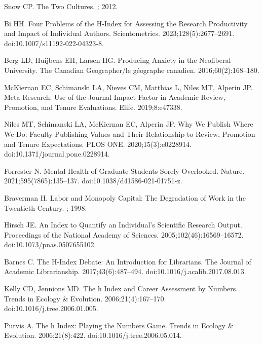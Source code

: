 \documentclass[
  10pt,
  letterpaper,
]{article}
\begin{document}
\begin{thebibliography}{10}
Snow CP.
\newblock The Two Cultures.
; 2012.

Bi HH.
\newblock Four Problems of the H-Index for Assessing the Research Productivity and Impact of Individual Authors.
\newblock Scientometrics. 2023;128(5):2677--2691.
\newblock doi:{10.1007/s11192-022-04323-8}.

Berg LD, Huijbens EH, Larsen HG.
\newblock Producing Anxiety in the Neoliberal University.
\newblock The Canadian Geographer/le g{\'e}ographe canadien. 2016;60(2):168--180.

McKiernan EC, Schimanski LA, Nieves CM, Matthias L, Niles MT, Alperin JP.
\newblock Meta-Research: {{Use}} of the Journal Impact Factor in Academic Review, Promotion, and Tenure Evaluations.
\newblock Elife. 2019;8:e47338.

Niles MT, Schimanski LA, McKiernan EC, Alperin JP.
\newblock Why We Publish Where We Do: {{Faculty}} Publishing Values and Their Relationship to Review, Promotion and Tenure Expectations.
\newblock PLOS ONE. 2020;15(3):e0228914.
\newblock doi:{10.1371/journal.pone.0228914}.

Forrester N.
\newblock Mental Health of Graduate Students Sorely Overlooked.
\newblock Nature. 2021;595(7865):135--137.
\newblock doi:{10.1038/d41586-021-01751-z}.

Braverman H.
\newblock Labor and Monopoly Capital: {{The}} Degradation of Work in the Twentieth Century.
; 1998.

Hirsch JE.
\newblock An Index to Quantify an Individual's Scientific Research Output.
\newblock Proceedings of the National Academy of Sciences. 2005;102(46):16569--16572.
\newblock doi:{10.1073/pnas.0507655102}.

Barnes C.
\newblock The H-Index {{Debate}}: {{An Introduction}} for {{Librarians}}.
\newblock The Journal of Academic Librarianship. 2017;43(6):487--494.
\newblock doi:{10.1016/j.acalib.2017.08.013}.

Kelly CD, Jennions MD.
\newblock The h Index and Career Assessment by Numbers.
\newblock Trends in Ecology \& Evolution. 2006;21(4):167--170.
\newblock doi:{10.1016/j.tree.2006.01.005}.

Purvis A.
\newblock The h Index: Playing the Numbers Game.
\newblock Trends in Ecology \& Evolution. 2006;21(8):422.
\newblock doi:{10.1016/j.tree.2006.05.014}.


\end{thebibliography}
\end{document}

